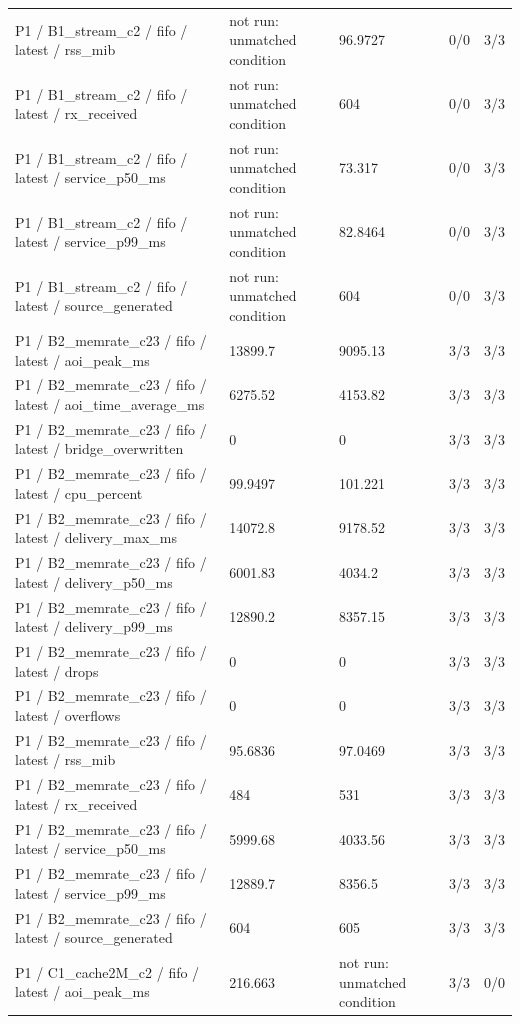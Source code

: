 \begin{tabular}{@{}lllll@{}}
P1 / B1\_stream\_c2 / fifo / latest / rss\_mib & not run: unmatched condition & 96.9727 & 0/0 & 3/3 \\
P1 / B1\_stream\_c2 / fifo / latest / rx\_received & not run: unmatched condition & 604 & 0/0 & 3/3 \\
P1 / B1\_stream\_c2 / fifo / latest / service\_p50\_ms & not run: unmatched condition & 73.317 & 0/0 & 3/3 \\
P1 / B1\_stream\_c2 / fifo / latest / service\_p99\_ms & not run: unmatched condition & 82.8464 & 0/0 & 3/3 \\
P1 / B1\_stream\_c2 / fifo / latest / source\_generated & not run: unmatched condition & 604 & 0/0 & 3/3 \\
P1 / B2\_memrate\_c23 / fifo / latest / aoi\_peak\_ms & 13899.7 & 9095.13 & 3/3 & 3/3 \\
P1 / B2\_memrate\_c23 / fifo / latest / aoi\_time\_average\_ms & 6275.52 & 4153.82 & 3/3 & 3/3 \\
P1 / B2\_memrate\_c23 / fifo / latest / bridge\_overwritten & 0 & 0 & 3/3 & 3/3 \\
P1 / B2\_memrate\_c23 / fifo / latest / cpu\_percent & 99.9497 & 101.221 & 3/3 & 3/3 \\
P1 / B2\_memrate\_c23 / fifo / latest / delivery\_max\_ms & 14072.8 & 9178.52 & 3/3 & 3/3 \\
P1 / B2\_memrate\_c23 / fifo / latest / delivery\_p50\_ms & 6001.83 & 4034.2 & 3/3 & 3/3 \\
P1 / B2\_memrate\_c23 / fifo / latest / delivery\_p99\_ms & 12890.2 & 8357.15 & 3/3 & 3/3 \\
P1 / B2\_memrate\_c23 / fifo / latest / drops & 0 & 0 & 3/3 & 3/3 \\
P1 / B2\_memrate\_c23 / fifo / latest / overflows & 0 & 0 & 3/3 & 3/3 \\
P1 / B2\_memrate\_c23 / fifo / latest / rss\_mib & 95.6836 & 97.0469 & 3/3 & 3/3 \\
P1 / B2\_memrate\_c23 / fifo / latest / rx\_received & 484 & 531 & 3/3 & 3/3 \\
P1 / B2\_memrate\_c23 / fifo / latest / service\_p50\_ms & 5999.68 & 4033.56 & 3/3 & 3/3 \\
P1 / B2\_memrate\_c23 / fifo / latest / service\_p99\_ms & 12889.7 & 8356.5 & 3/3 & 3/3 \\
P1 / B2\_memrate\_c23 / fifo / latest / source\_generated & 604 & 605 & 3/3 & 3/3 \\
P1 / C1\_cache2M\_c2 / fifo / latest / aoi\_peak\_ms & 216.663 & not run: unmatched condition & 3/3 & 0/0 \\

\end{tabular}
